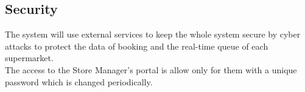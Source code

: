 \subsection{Security}

The system will use external services to keep the whole system secure by cyber attacks to protect the data of booking and the real-time queue of each supermarket.\\
The access to the Store Manager’s portal is allow only for them with a unique password which is changed periodically.  